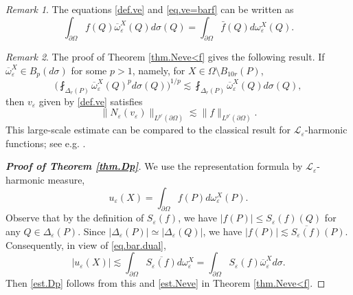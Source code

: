 \documentclass[reqno,12pt]{amsart} %
\newtheorem{theorem}{Theorem}[section]
\theoremstyle{definition}
\theoremstyle{remark}
\newtheorem{remark}[theorem]{Remark}
\numberwithin{equation}{section}
\newcommand{\cL}{\mathcal{L}}
\newcommand{\e}{\varepsilon}
\begin{document}
\begin{remark}
    The equations \eqref{def.ve} and \eqref{eq.ve=barf}  can be written as
\begin{equation}\label{eq.bar.dual}
    \int_{\partial \Omega} f(Q) \overline{\omega}^X_\e(Q) d\sigma(Q) = \int_{\partial \Omega} \bar{f}(Q) d\omega_\e^X(Q).
\end{equation}
\end{remark}

\begin{remark}\label{rmk.Bp-Dp'}
    The proof of Theorem \ref{thm.Neve<f} gives the following result. If $\overline{\omega}_\e^X \in B_p(d\sigma)$ for some $p>1$, namely, for $X\in \Omega\setminus B_{10r}(P)$,
    \begin{equation}
        \bigg( \fint_{\Delta_r(P)} \overline{\omega}_\e^X(Q)^p d\sigma(Q) \bigg)^{1/p} \lesssim \fint_{\Delta_r(P)} \overline{\omega}_\e^X(Q) d\sigma(Q),
    \end{equation}
    then $v_\e$ given by \eqref{def.ve} satisfies
    \begin{equation}
            \| N_\e(v_\e) \|_{L^{p'}(\partial \Omega)} \lesssim \| f \|_{L^{p'}(\partial \Omega)}.
    \end{equation}
    This large-scale estimate can be compared to the classical result for $\cL_\e$-harmonic functions; see e.g. \cite{D77,D79,FKP91}.
\end{remark}



\begin{proof}[\textbf{Proof of Theorem \ref{thm.Dp}}]
We use the representation formula by $\cL_\e$-harmonic measure,
\begin{equation}
    u_\e(X) = \int_{\partial \Omega} f(P) d\omega_\e^X(P).
\end{equation}
Observe that by the definition of $S_\e(f)$, we have $|f(P)| \le S_\e(f)(Q)$ for any $Q\in \Delta_\e(P)$. Since $|\Delta_\e(P)| \simeq |\Delta_\e(Q)|$, we have
$|f(P)| \lesssim \overline{S_\e(f)}(P)$.
Consequently, in view of \eqref{eq.bar.dual},
\begin{equation}
    |u_\e(X)| \lesssim \int_{\partial \Omega} \overline{S_\e(f)} d\omega_\e^X = \int_{\partial \Omega} S_\e(f) \overline{\omega}_\e^X d\sigma.
\end{equation}
Then \eqref{est.Dp} follows from this and \eqref{est.Neve} in Theorem \ref{thm.Neve<f}.
\end{proof}
\end{document}
